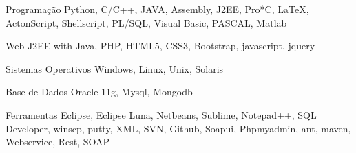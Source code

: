


\begin{cvskills}


\cvskill
{Programação} %
{Python, C/C++, JAVA, Assembly, J2EE,  Pro*C,  LaTeX, ActonScript, Shellscript, PL/SQL, Visual Basic,
 PASCAL, Matlab } %


\cvskill
{Web} %
{J2EE with Java, PHP, HTML5, CSS3, Bootstrap, javascript, jquery } %


\cvskill
{Sistemas Operativos} %
{Windows, Linux, Unix, Solaris} %


\cvskill
{Base de Dados} %
{Oracle 11g, Mysql, Mongodb } %


\cvskill
{Ferramentas} %
{Eclipse, Eclipse Luna, Netbeans, Sublime, Notepad++, SQL Developer,  winscp,  putty, XML, SVN, Github,  Soapui, Phpmyadmin, ant, maven, Webservice, Rest, SOAP } %



\end{cvskills}